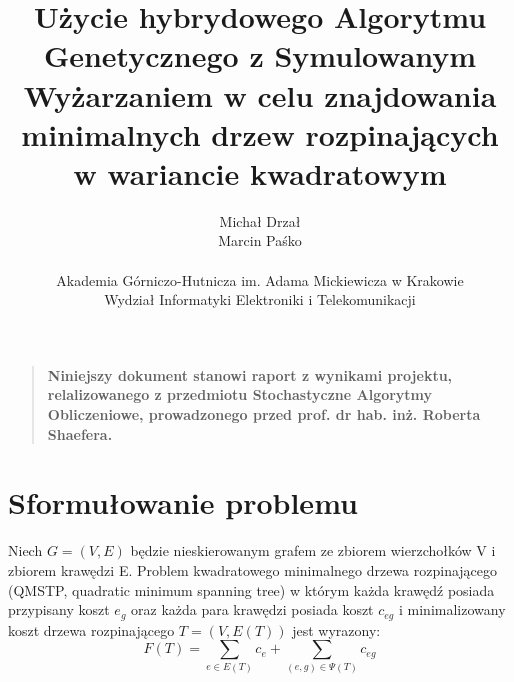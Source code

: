 \documentclass[12pt]{article}
\title{Użycie hybrydowego Algorytmu Genetycznego z Symulowanym Wyżarzaniem w celu znajdowania minimalnych drzew rozpinających w wariancie kwadratowym}
\author
{Michał Drzał\\Marcin Paśko\\
\\
\normalsize{Akademia Górniczo-Hutnicza im. Adama Mickiewicza w Krakowie}\\
\normalsize{Wydział Informatyki Elektroniki i Telekomunikacji}\\
}
\date{}
\newenvironment{sciabstract}{%
\begin{quote} \bf}
{\end{quote}}
\begin{document}
 


\baselineskip24pt


\maketitle 




\begin{sciabstract}
  Niniejszy dokument stanowi raport z wynikami projektu, relalizowanego z przedmiotu Stochastyczne Algorytmy Obliczeniowe, prowadzonego przed prof. dr hab. inż. Roberta Shaefera.
\end{sciabstract}




\section*{Sformułowanie problemu}





Niech $G =(V,E)$ będzie nieskierowanym grafem ze zbiorem wierzchołków V i zbiorem krawędzi E. Problem kwadratowego minimalnego drzewa rozpinającego (QMSTP, quadratic minimum spanning tree) w którym każda krawędź posiada przypisany koszt $e_{g}$ oraz każda para krawędzi posiada koszt $c_{eg}$ i minimalizowany koszt drzewa rozpinającego $T= (V, E(T))$ jest wyrazony:
$$ F(T) = \sum_{e \in E(T) } c_e + \sum_{(e,g) \in \Psi (T)} c_{eg} $$
\end{document}
